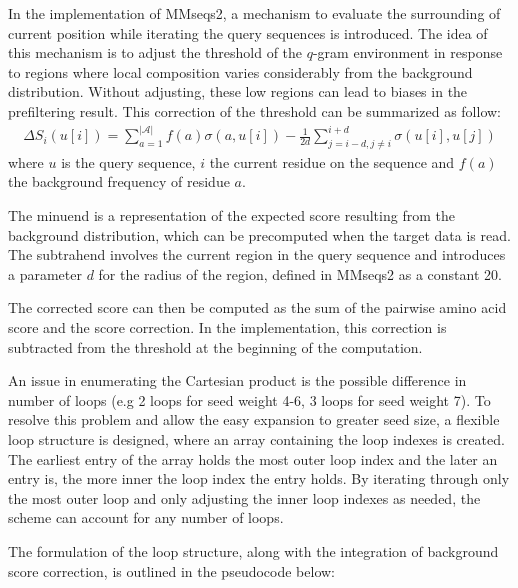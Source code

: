 In the implementation of MMseqs2, a mechanism to evaluate the surrounding of current position while iterating the query sequences is introduced. The idea of this mechanism is to adjust the threshold of the \(q\)-gram environment in response to regions where local composition varies considerably from the background distribution. Without adjusting, these low regions can lead to biases in the prefiltering result. This correction of the threshold can be summarized as follow:
\begin{align}
    \Delta S_i(u[i]) = \sum_{a=1}^{|\mathcal{A}|}f(a)\sigma(a,u[i])-\frac{1}{2d}\sum_{j=i-d,j\neq i}^{i+d}\sigma (u[i],u[j])
\end{align}
where \(u\) is the query sequence, \(i\) the current residue on the sequence and \(f(a)\) the background frequency of residue \(a\).

The minuend is a representation of the expected score resulting from the background distribution, which can be precomputed when the target data is read. The subtrahend involves the current region in the query sequence and introduces a parameter \(d\) for the radius of the region, defined in MMseqs2 as a constant 20.

The corrected score can then be computed as the sum of the pairwise amino acid score and the score correction. In the implementation, this correction is subtracted from the threshold at the beginning of the computation.

An issue in enumerating the Cartesian product is the possible difference in number of loops (e.g 2 loops for seed weight 4-6, 3 loops for seed weight 7). To resolve this problem and allow the easy expansion to greater seed size, a flexible loop structure is designed, where an array containing the loop indexes is created. The earliest entry of the array holds the most outer loop index and the later an entry is, the more inner the loop index the entry holds. By iterating through only the most outer loop and only adjusting the inner loop indexes as needed, the scheme can account for any number of loops.

The formulation of the loop structure, along with the integration of background score correction, is outlined in the pseudocode below:

